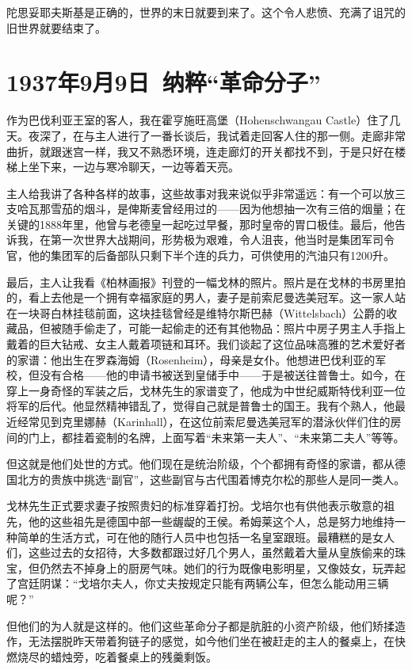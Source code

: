 \documentclass[UTF8]{ctexart}
\begin{document}
陀思妥耶夫斯基是正确的，世界的末日就要到来了。这个令人悲愤、充满了诅咒的旧世界就要结束了。

\section{1937年9月9日\ 纳粹“革命分子”}

作为巴伐利亚王室的客人，我在霍亨施旺高堡（Hohenschwangau Castle）住了几天。夜深了，在与主人进行了一番长谈后，我试着走回客人住的那一侧。走廊非常曲折，就跟迷宫一样，我又不熟悉环境，连走廊灯的开关都找不到，于是只好在楼梯上坐下来，一边与寒冷聊天，一边等着天亮。

主人给我讲了各种各样的故事，这些故事对我来说似乎非常遥远：有一个可以放三支哈瓦那雪茄的烟斗，是俾斯麦曾经用过的——因为他想抽一次有三倍的烟量；在关键的1888年里，他曾与老德皇一起吃过早餐，那时皇帝的胃口极佳。最后，他告诉我，在第一次世界大战期间，形势极为艰难，令人沮丧，他当时是集团军司令官，他的集团军的后备部队只剩下半个连的兵力，可供使用的汽油只有1200升。

最后，主人让我看《柏林画报》刊登的一幅戈林的照片。照片是在戈林的书房里拍的，看上去他是一个拥有幸福家庭的男人，妻子是前索尼曼选美冠军。这一家人站在一块哥白林挂毯前面，这块挂毯曾经是维特尔斯巴赫（Wittelsbach）公爵的收藏品，但被随手偷走了，可能一起偷走的还有其他物品：照片中房子男主人手指上戴着的巨大钻戒、女主人戴着项链和耳环。我们谈起了这位品味高雅的艺术爱好者的家谱：他出生在罗森海姆（Rosenheim），母亲是女仆。他想进巴伐利亚的军校，但没有合格——他的申请书被送到皇储手中——于是被送往普鲁士。如今，在穿上一身奇怪的军装之后，戈林先生的家谱变了，他成为中世纪威斯特伐利亚一位将军的后代。他显然精神错乱了，觉得自己就是普鲁士的国王。我有个熟人，他最近经常见到克里娜赫（Karinhall），在这位前索尼曼选美冠军的潜泳伙伴们住的房间的门上，都挂着瓷制的名牌，上面写着“未来第一夫人”、“未来第二夫人”等等。

但这就是他们处世的方式。他们现在是统治阶级，个个都拥有奇怪的家谱，都从德国北方的贵族中挑选“副官”，这些副官与古代围着博克尔松的那些人是同一类人。

戈林先生正式要求妻子按照贵妇的标准穿着打扮。戈培尔也有供他表示敬意的祖先，他的这些祖先是德国中部一些龌龊的王侯。希姆莱这个人，总是努力地维持一种简单的生活方式，可在他的随行人员中也包括一名皇室跟班。最糟糕的是女人们，这些过去的女招待，大多数都跟过好几个男人，虽然戴着大量从皇族偷来的珠宝，但仍然去不掉身上的厨房气味。她们的行为既像电影明星，又像妓女，玩弄起了宫廷阴谋：“戈培尔夫人，你丈夫按规定只能有两辆公车，但怎么能动用三辆呢？”

但他们的为人就是这样的。他们这些革命分子都是肮脏的小资产阶级，他们矫揉造作，无法摆脱昨天带着狗链子的感觉，如今他们坐在被赶走的主人的餐桌上，在快燃烧尽的蜡烛旁，吃着餐桌上的残羹剩饭。
\end{document}
